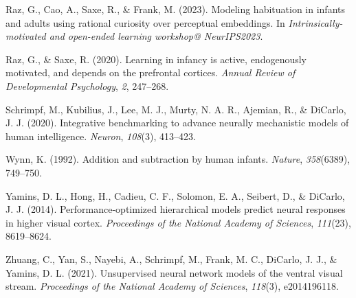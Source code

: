 \documentclass[10pt, letterpaper]{article}
\newenvironment{CSLReferences}%
  {}%
  {\par}
\begin{document}
\begin{CSLReferences}{1}{0}
\leavevmode{}%
Raz, G., Cao, A., Saxe, R., \& Frank, M. (2023). Modeling habituation in
infants and adults using rational curiosity over perceptual embeddings.
In \emph{Intrinsically-motivated and open-ended learning workshop@
NeurIPS2023}.

\leavevmode{}%
Raz, G., \& Saxe, R. (2020). Learning in infancy is active, endogenously
motivated, and depends on the prefrontal cortices. \emph{Annual Review
of Developmental Psychology}, \emph{2}, 247--268.

\leavevmode{}%
Schrimpf, M., Kubilius, J., Lee, M. J., Murty, N. A. R., Ajemian, R., \&
DiCarlo, J. J. (2020). Integrative benchmarking to advance neurally
mechanistic models of human intelligence. \emph{Neuron}, \emph{108}(3),
413--423.

\leavevmode{}%
Wynn, K. (1992). Addition and subtraction by human infants.
\emph{Nature}, \emph{358}(6389), 749--750.

\leavevmode{}%
Yamins, D. L., Hong, H., Cadieu, C. F., Solomon, E. A., Seibert, D., \&
DiCarlo, J. J. (2014). Performance-optimized hierarchical models predict
neural responses in higher visual cortex. \emph{Proceedings of the
National Academy of Sciences}, \emph{111}(23), 8619--8624.

\leavevmode{}%
Zhuang, C., Yan, S., Nayebi, A., Schrimpf, M., Frank, M. C., DiCarlo, J.
J., \& Yamins, D. L. (2021). Unsupervised neural network models of the
ventral visual stream. \emph{Proceedings of the National Academy of
Sciences}, \emph{118}(3), e2014196118.

\end{CSLReferences}


\end{document}
